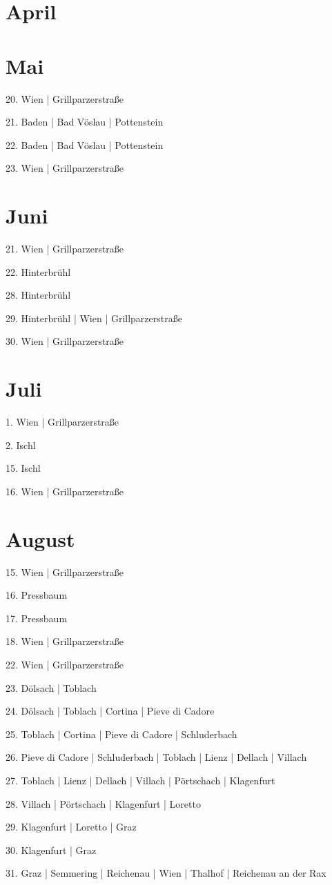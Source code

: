 \documentclass[twoside=false,titlepage=false,open=any, parskip=never, fontsize=10pt, headings=small, chapterprefix=false, appendixprefix=false, DIV=15]{scrbook}
\begin{document}
\begin{multicols}{3}
            \section*{April}
            \section*{Mai}
            20. Wien | Grillparzerstraße\par
            21. Baden | Bad Vöslau | Pottenstein\par
            22. Baden | Bad Vöslau | Pottenstein\par
            23. Wien | Grillparzerstraße\par
            \section*{Juni}
            21. Wien | Grillparzerstraße\par
            22. Hinterbrühl\par
            28. Hinterbrühl\par
            29. Hinterbrühl | Wien | Grillparzerstraße\par
            30. Wien | Grillparzerstraße\par
            \section*{Juli}
            1. Wien | Grillparzerstraße\par
            2. Ischl\par
            15. Ischl\par
            16. Wien | Grillparzerstraße\par
            \section*{August}
            15. Wien | Grillparzerstraße\par
            16. Pressbaum\par
            17. Pressbaum\par
            18. Wien | Grillparzerstraße\par
            22. Wien | Grillparzerstraße\par
            23. Dölsach | Toblach\par
            24. Dölsach | Toblach | Cortina | Pieve di Cadore\par
            25. Toblach | Cortina | Pieve di Cadore | Schluderbach\par
            26. Pieve di Cadore | Schluderbach | Toblach | Lienz | Dellach | Villach\par
            27. Toblach | Lienz | Dellach | Villach | Pörtschach | Klagenfurt\par
            28. Villach | Pörtschach | Klagenfurt | Loretto\par
            29. Klagenfurt | Loretto | Graz\par
            30. Klagenfurt | Graz\par
            31. Graz | Semmering | Reichenau | Wien | Thalhof | Reichenau an der Rax\par

\end{multicols}
\end{document}
